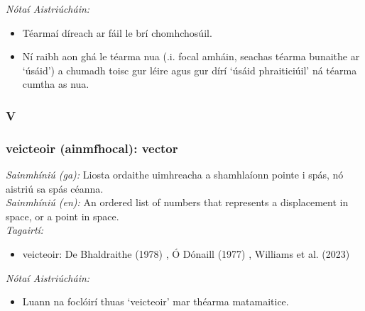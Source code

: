  \noindent \textit{Nótaí Aistriúcháin:}
\begin{itemize}
	\item Téarmaí díreach ar fáil le brí chomhchosúil.
	\item Ní raibh aon ghá le téarma nua (.i. focal amháin, seachas téarma bunaithe ar `úsáid') a chumadh toisc gur léire agus gur dírí `úsáid phraiticiúil' ná téarma cumtha as nua.
\end{itemize}


 \subsubsection*{V}

\subsubsection*{veicteoir (ainmfhocal): vector}
 \noindent \textit{Sainmhíniú (ga):} Liosta ordaithe uimhreacha a shamhlaíonn pointe i spás, nó aistriú sa spás céanna.
\\
 \noindent \textit{Sainmhíniú (en):} An ordered list of numbers that represents a displacement in space, or a point in space.
\\
 \noindent \textit{Tagairtí:}
\begin{itemize}
	\item veicteoir: De Bhaldraithe (1978) \cite{de-bhaldraithe}, Ó Dónaill (1977) \cite{odonaill}, Williams et al. (2023) \cite{storchiste}
\end{itemize}

 \noindent \textit{Nótaí Aistriúcháin:}
\begin{itemize}
	\item Luann na foclóirí thuas `veicteoir' mar théarma matamaitice.
\end{itemize}



